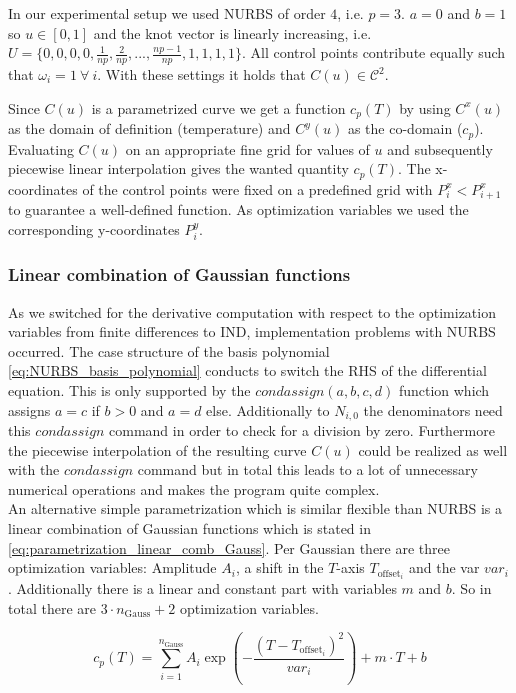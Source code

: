 \documentclass{scrartcl}[12pt, halfparskip]
\numberwithin{equation}{section}
\numberwithin{figure}{section}
\numberwithin{table}{section}
\begin{document}
In our experimental setup we used NURBS of order $4$, i.e. $p=3$. $a=0$ and $b=1$ so $u \in [0,1]$ and the knot vector is linearly increasing, i.e. $U = \{ 0,0,0,0,\frac{1}{n p},\frac{2}{n p},...,\frac{n p - 1}{n p},1,1,1,1 \}$. All control points contribute equally such that $\omega_i=1 \ \forall \ i$. With these settings it holds that $C(u) \in \mathcal{C}^2$.

Since $C(u)$ is a parametrized curve we get a function $c_p(T)$ by using $C^x(u)$ as the domain of definition (temperature) and $C^y(u)$ as the co-domain ($c_p$). Evaluating $C(u)$ on an appropriate fine grid for values of $u$ and subsequently piecewise linear interpolation gives the wanted quantity $c_p(T)$.
The x-coordinates of the control points were fixed on a predefined grid with $P_i^x < P_{i+1}^x$ to guarantee a well-defined function.
As optimization variables we used the corresponding y-coordinates $P_i^y$.


\subsubsection{Linear combination of Gaussian functions}
\label{sec:parametrization_Gausse}

As we switched for the derivative computation with respect to the optimization variables from finite differences to IND, implementation problems with NURBS occurred. 
The case structure of the basis polynomial \cref{eq:NURBS_basis_polynomial} conducts to switch the RHS of the differential equation. This is only supported by the $condassign(a,b,c,d)$ function which assigns $a=c$ if $b>0$ and $a=d$ else. Additionally to $N_{i,0}$ the denominators need this $condassign$ command in order to check for a division by zero. 
Furthermore the piecewise interpolation of the resulting curve $C(u)$ could be realized as well with the $condassign$ command but in total this leads to a lot of unnecessary numerical operations and makes the program quite complex. \\
An alternative simple parametrization which is similar flexible than NURBS is a linear combination of Gaussian functions which is stated in \cref{eq:parametrization_linear_comb_Gauss}. Per Gaussian there are three optimization variables: Amplitude $A_i$, a shift in the $T$-axis $T_{\text{offset}_i}$ and the var $var_i$. Additionally there is a linear and constant part with variables $m$ and $b$. So in total there are $3 \cdot n_{\text{Gauss}} + 2$ optimization variables. 

\begin{equation}
c_p(T) = \sum_{i=1}^{n_{\text{Gauss}}} A_i \exp\left(- \frac{(T - T_{\text{offset}_i})^2}{var_i}\right) + m \cdot T + b
\label{eq:parametrization_linear_comb_Gauss}
\end{equation} \\
\end{document}
